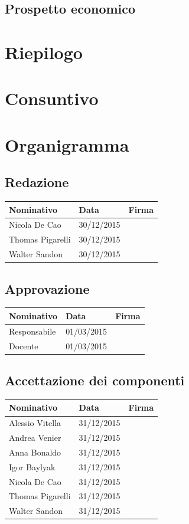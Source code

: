 \documentclass[12pt,a4paper]{article}
\begin{document}
\subsection{Prospetto economico}


\newpage
\section{Riepilogo}


\newpage
\section{Consuntivo}

\newpage
\appendix
\section{Organigramma}

\subsection{Redazione}

\begin{tabular}{| l | l | l |}
    \hline
    Nominativo & Data & Firma \\ \hline
    Nicola De Cao & 30/12/2015 & \\ \hline
    Thomas Pigarelli & 30/12/2015 & \\ \hline
    Walter Sandon & 30/12/2015 & \\ \hline
\end{tabular}


\subsection{Approvazione}

\begin{tabular}{| l | l | l |}
    \hline
    Nominativo & Data & Firma \\ \hline
    Responsabile & 01/03/2015 & \\ \hline
    Docente & 01/03/2015 & \\ \hline
\end{tabular}

\subsection{Accettazione dei componenti}

\begin{tabular}{| l | l | l |}
    \hline
    Nominativo & Data & Firma \\ \hline
    Alessio Vitella & 31/12/2015 & \\ \hline
    Andrea Venier & 31/12/2015 & \\ \hline
    Anna Bonaldo & 31/12/2015 & \\ \hline
    Igor Baylyak & 31/12/2015 & \\ \hline
    Nicola De Cao & 31/12/2015 & \\ \hline
    Thomas Pigarelli & 31/12/2015 & \\ \hline
    Walter Sandon & 31/12/2015 & \\ \hline
\end{tabular}
\end{document}
